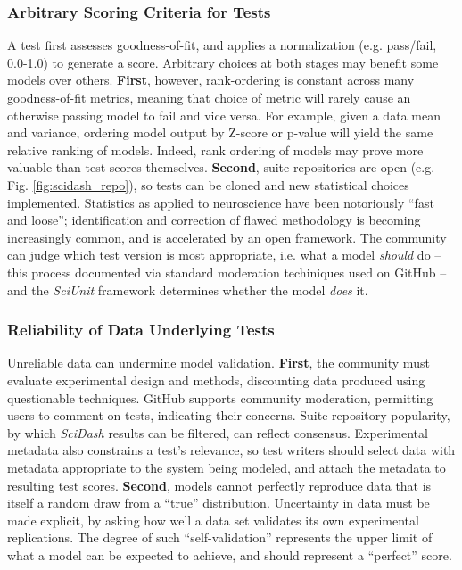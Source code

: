 \documentclass[11pt,letterpaper]{article}
\begin{document}
\subsubsection{Arbitrary Scoring Criteria for Tests}
A test first assesses goodness-of-fit, and applies a normalization (e.g. pass/fail, 0.0-1.0) to generate a score.  Arbitrary choices at both stages may benefit some models over others.  \textbf{First}, however, rank-ordering is constant across many goodness-of-fit metrics, meaning that choice of metric will rarely cause an otherwise passing model to fail and vice versa.  For example, given a data mean and variance, ordering model output by Z-score or p-value will yield the same relative ranking of models. Indeed, rank ordering of models may prove more valuable than test scores themselves. \textbf{Second}, suite repositories are open (e.g. Fig. \ref{fig:scidash_repo}), so tests can be cloned and new statistical choices implemented. Statistics as applied to neuroscience have been notoriously ``fast and loose''; identification and correction of flawed methodology is becoming increasingly common\cite{button_power_2013,kriegeskorte_circular_2009,galbraith_study_2010,fish_fmri_url}, and is accelerated by an open framework. The community can judge which test version is most appropriate, i.e. what a model \textit{should} do -- this process documented via standard moderation techiniques used on GitHub -- and the \textit{SciUnit} framework determines whether the model \textit{does} it.  

\subsubsection{Reliability of Data Underlying Tests}
Unreliable data can undermine model validation. \textbf{First}, the community must evaluate experimental design and methods, discounting data produced using questionable techniques.  GitHub supports community moderation, permitting users to comment on tests, indicating their concerns.  Suite repository popularity, by which \textit{SciDash} results can be filtered, can reflect consensus.  Experimental metadata also constrains a test's relevance, so test writers should select data with metadata appropriate to the system being modeled, and attach the metadata to resulting test scores.  \textbf{Second}, models cannot perfectly reproduce data that is itself a random draw from a ``true'' distribution.  Uncertainty in data must be made explicit, by asking how well a data set validates its own experimental replications\cite{kriegeskorte_representational_2008}.  The degree of such ``self-validation'' represents the upper limit of what a model can be expected to achieve, and should represent a ``perfect'' score.  
\end{document}
